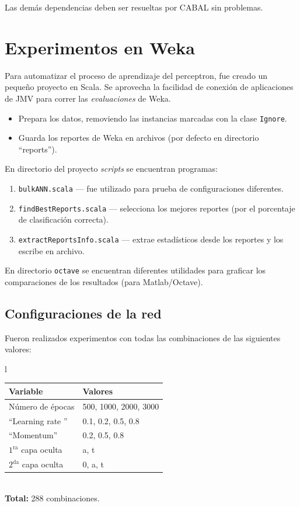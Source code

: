 \documentclass{article}
\begin{document}
Las demás dependencias deben ser resueltas por CABAL sin problemas.

\section{Experimentos en Weka}

Para automatizar el proceso de aprendizaje del perceptron, fue creado un pequeño proyecto en Scala. Se aprovecha la facilidad de conexión de aplicaciones de JMV para correr las \emph{evaluaciones} de Weka.

\begin{itemize}
\item Prepara los datos, removiendo las instancias marcadas con la clase 
    \verb|Ignore|.
\item Guarda los reportes de Weka en archivos (por defecto en directorio ``reports'').
\end{itemize}

\medskip
En directorio del proyecto \emph{scripts} se encuentran programas:
\begin{enumerate}
\item \verb|bulkANN.scala| --- fue utilizado para prueba de configuraciones diferentes.
\item \verb|findBestReports.scala| --- selecciona los mejores reportes (por el porcentaje de clasificación correcta).
\item \verb|extractReportsInfo.scala| --- extrae estadísticos desde los reportes y los escribe en archivo.
\end{enumerate}

\medskip
En directorio \verb|octave| se encuentran diferentes utilidades para graficar los comparaciones de los resultados (para Matlab/Octave).

\subsection{Configuraciones de la red}

Fueron realizados experimentos con todas las combinaciones de las siguientes valores:

\begin{center}
\begin{tabular}{l}
\begin{tabular}{|l|l|}
\hline
Variable 					& Valores				\\
\hline
Número de épocas			& 500, 1000, 2000, 3000 \\
``Learning rate ''  		& 0.1, 0.2, 0.5, 0.8 	\\
``Momentum''				& 0.2, 0.5, 0.8 		\\
$1^{\text{ra}}$ capa oculta	& a, t					\\
$2^{\text{da}}$ capa oculta	& 0, a, t				\\
\hline
\end{tabular}\\
\textbf{Total:} 288 combinaciones.
\end{tabular}
\end{center}
\end{document}
